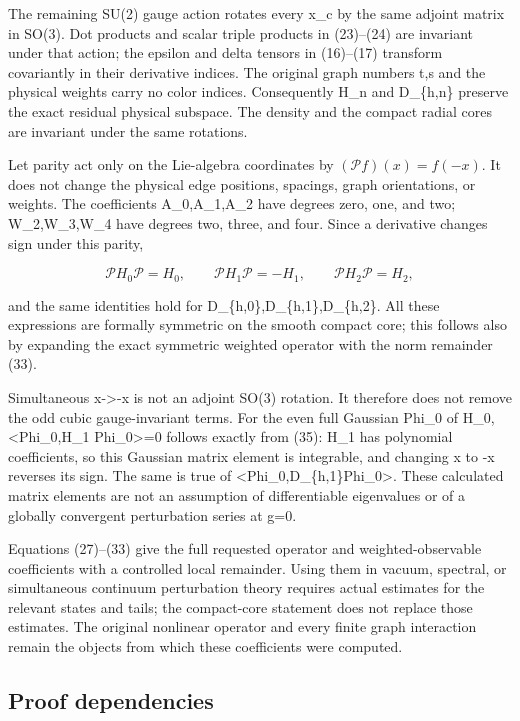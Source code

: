 \documentclass[
  11pt,
]{article}
\begin{document}
The remaining SU(2) gauge action rotates every x\_c by the same adjoint
matrix in SO(3). Dot products and scalar triple products in (23)--(24)
are invariant under that action; the epsilon and delta tensors in
(16)--(17) transform covariantly in their derivative indices. The
original graph numbers t,s and the physical weights carry no color
indices. Consequently H\_n and D\_\{h,n\} preserve the exact residual
physical subspace. The density and the compact radial cores are
invariant under the same rotations.

Let parity act only on the Lie-algebra coordinates by
\((\mathcal Pf)(x)=f(-x)\). It does not change the physical edge
positions, spacings, graph orientations, or weights. The coefficients
A\_0,A\_1,A\_2 have degrees zero, one, and two; W\_2,W\_3,W\_4 have
degrees two, three, and four. Since a derivative changes sign under this
parity,

\[
 \mathcal PH_0\mathcal P=H_0,\qquad
 \mathcal PH_1\mathcal P=-H_1,\qquad
 \mathcal PH_2\mathcal P=H_2,
                                                               \tag{35}
\]

and the same identities hold for D\_\{h,0\},D\_\{h,1\},D\_\{h,2\}. All
these expressions are formally symmetric on the smooth compact core;
this follows also by expanding the exact symmetric weighted operator
with the norm remainder (33).

Simultaneous x-\textgreater-x is not an adjoint SO(3) rotation. It
therefore does not remove the odd cubic gauge-invariant terms. For the
even full Gaussian Phi\_0 of H\_0, \textless Phi\_0,H\_1
Phi\_0\textgreater=0 follows exactly from (35): H\_1 has polynomial
coefficients, so this Gaussian matrix element is integrable, and
changing x to -x reverses its sign. The same is true of
\textless Phi\_0,D\_\{h,1\}Phi\_0\textgreater. These calculated matrix
elements are not an assumption of differentiable eigenvalues or of a
globally convergent perturbation series at g=0.

Equations (27)--(33) give the full requested operator and
weighted-observable coefficients with a controlled local remainder.
Using them in vacuum, spectral, or simultaneous continuum perturbation
theory requires actual estimates for the relevant states and tails; the
compact-core statement does not replace those estimates. The original
nonlinear operator and every finite graph interaction remain the objects
from which these coefficients were computed.

\subsection{Proof dependencies}\label{weak-coupling-part-14-proof-dependencies}
\end{document}
